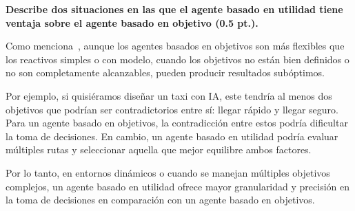\textbf{Describe dos situaciones en las que el agente basado en utilidad tiene ventaja sobre el agente basado en objetivo (0.5 pt.).} \vspace{.3cm}

Como menciona~\cite{SotoAstorga2025}, aunque los agentes basados en objetivos son más flexibles que los reactivos simples o con modelo, cuando los objetivos no están bien definidos o no son completamente alcanzables, pueden producir resultados subóptimos. \vspace{.2cm}

Por ejemplo, si quisiéramos diseñar un taxi con IA, este tendría al menos dos objetivos que podrían ser contradictorios entre sí: llegar rápido y llegar seguro. Para un agente basado en objetivos, la contradicción entre estos podría dificultar la toma de decisiones. En cambio, un agente basado en utilidad podría evaluar múltiples rutas y seleccionar aquella que mejor equilibre ambos factores. \vspace{.2cm}

Por lo tanto, en entornos dinámicos o cuando se manejan múltiples objetivos complejos, un agente basado en utilidad ofrece mayor granularidad y precisión en la toma de decisiones en comparación con un agente basado en objetivos.